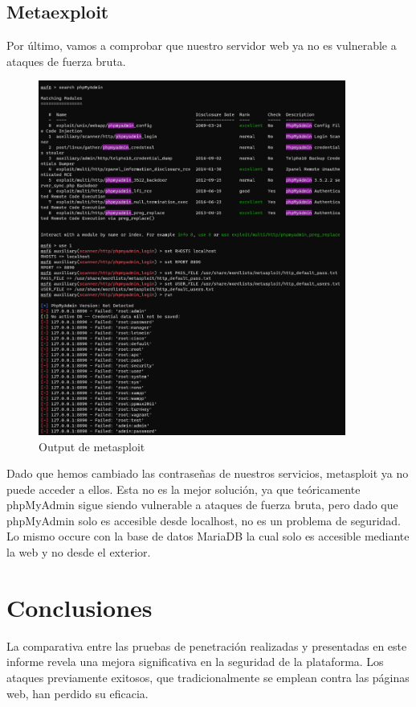 \documentclass{report}
\begin{document}
        \section{Metaexploit}
            Por último, vamos a comprobar que nuestro servidor web ya no es vulnerable a ataques de fuerza bruta.
            \begin{figure}[H]
                \centering
                \includegraphics[width=0.9\textwidth]{./img/audit2/msf1.png}
                \caption{Output de metasploit}
            \end{figure}
            Dado que hemos cambiado las contraseñas de nuestros servicios, metasploit ya no puede acceder a ellos.
            Esta no es la mejor solución, ya que teóricamente phpMyAdmin sigue siendo vulnerable a ataques de fuerza bruta, pero dado que phpMyAdmin solo es accesible desde localhost, no es un problema de seguridad.
            Lo mismo occure con la base de datos MariaDB la cual solo es accesible mediante la web y no desde el exterior.
        \clearpage
    \chapter{Conclusiones}
    La comparativa entre las pruebas de penetración realizadas y presentadas en este informe revela una mejora significativa en la seguridad de la plataforma. Los ataques previamente exitosos, que tradicionalmente se emplean contra las páginas web, han perdido su eficacia.\\
    
\end{document}
